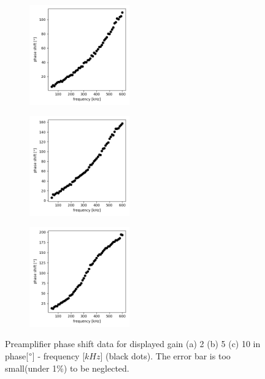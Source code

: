 \documentclass{article}
\begin{document}
  \begin{figure}[H]
    \begin{subfigure}[b]{4.3cm}
        \centering
        \includegraphics[width=4.3cm]{../results/preamplifier_phase_freq_plot(gain2).png}
        \caption{}
    \end{subfigure}
    \hfill
    \begin{subfigure}[b]{4.3cm}
      \centering
      \includegraphics[width=4.3cm]{../results/preamplifier_phase_freq_plot(gain5).png}
      \caption{}
  \end{subfigure}
  \hfill
  \begin{subfigure}[b]{4.3cm}
    \centering
    \includegraphics[width=4.3cm]{../results/preamplifier_phase_freq_plot(gain10).png}
    \caption{}
  \end{subfigure}
  \hfill
    \caption{Preamplifier phase shift data for displayed gain (a) 2 (b) 5 (c) 10 in phase[$\degree$] - frequency [$kHz$] (black dots).
    The error bar is too small(under 1\%) to be neglected.
     }
    \label{fig: preamplifier_phase_plot}
  \end{figure}
\end{document}
